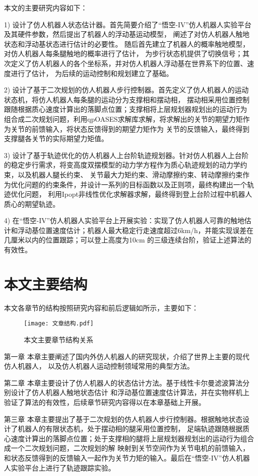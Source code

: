 本文的主要研究内容如下：

1) 设计了仿人机器人状态估计器。首先简要介绍了“悟空-IV”仿人机器人实验平台及其硬件参数，然后提出了机器人的浮动基运动模型，
阐述了对仿人机器人触地状态和浮动基状态进行估计的必要性。
随后首先建立了机器人的概率触地模型，对仿人机器人每条腿触地的概率进行了估计，
为步行状态机提供了切换信号；其次定义了仿人机器人的各个坐标系，并对仿人机器人浮动基在世界系下的位置、速度进行了估计，
为后续的运动控制和规划建立了基础。

2) 设计了基于二次规划的仿人机器人步行控制器。首先定义了仿人机器人的运动状态机，将仿人机器人每条腿的运动分为支撑相和摆动相，
摆动相采用位置控制跟随根据质心速度计算出的落脚点位置；支撑相将上层规划器规划出的运动行为
组合成二次规划问题，利用qpOASES求解库求解，将求解出的关节的期望力矩作为关节的前馈输入，将状态反馈得到的期望力矩作为
关节的反馈输入，最终得到支撑腿各关节的实际期望力矩值。

3) 设计了基于轨迹优化的仿人机器人上台阶轨迹规划器。针对仿人机器人上台阶的稳定步行需求，将变高度双摆模型的动力学方程作为质心轨迹规划的动力学约束，以及机器人腿长约束、
关节最大力矩约束、滑动摩擦约束、转动摩擦约束作为优化问题的约束条件，并设计一系列的目标函数以及正则项，最终构建出一个轨迹优化问题，
利用Ipopt非线性优化求解器求解，最终得到登上台阶过程中机器人质心的期望轨迹。

4) 在“悟空-IV”仿人机器人实验平台上开展实验：实现了仿人机器人可靠的触地估计和浮动基位置速度估计；机器人最大稳定行走速度超过6km/h，并能实现误差在几厘米以内的位置跟踪；可以登上高度为10cm
的三级连续台阶，验证上述算法的有效性。

\section{本文主要结构}
本文各章节的结构按照研究内容和前后逻辑如所示，主要如下：
\begin{figure}[h]
    \centering
    \texttt{[image: 文章结构.pdf]}
    \caption{\label{fig:artticle_struct}本文主要章节结构关系}
\end{figure}
第一章 本章主要阐述了国内外仿人机器人的研究现状，介绍了世界上主要的现代仿人机器人，
以及仿人机器人运动控制领域常用的典型方法。

第二章 本章主要设计了仿人机器人的状态估计方法。基于线性卡尔曼滤波算法分别设计了仿人机器人触地状态估计
和浮动基位置速度估计算法，并在实物样机上验证了算法的有效性，后续章节研究内容得以在本章基础上开展。

第三章 本章主要提出了基于二次规划的仿人机器人步行控制器。根据触地状态设计了机器人的有限状态机，处于摆动相的腿采用位置控制，
足端轨迹跟随根据质心速度计算出的落脚点位置；处于支撑相的腿将上层规划器规划出的运动行为组合成一个二次规划问题，二次规划的解
映射到关节空间作为关节电机的前馈输入，和状态反馈得到的反馈输入一起作为关节力矩的输入。最后在“悟空-IV”仿人机器人实验平台上进行了轨迹跟踪实验。

